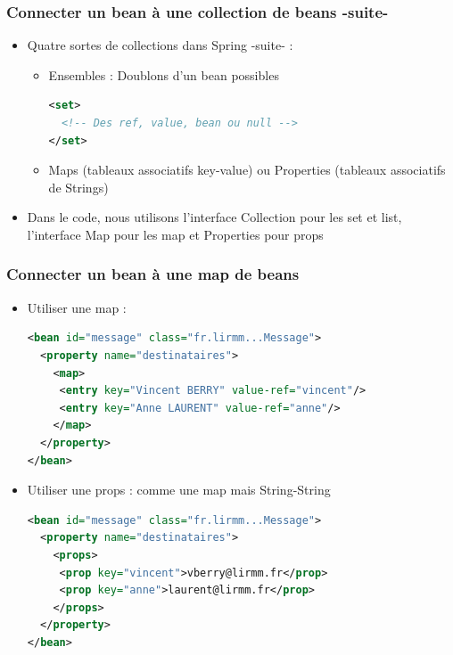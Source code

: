 \documentclass{beamer}
\begin{document}
\begin{frame}[fragile]
  \frametitle{Connecter un bean à une collection de beans -suite-}
  \begin{itemize}
    \item Quatre sortes de collections dans Spring -suite- :
\begin{itemize}
\item Ensembles : Doublons d'un bean possibles
\begin{lstlisting}[language=XML,basicstyle=\scriptsize]      
<set>
  <!-- Des ref, value, bean ou null -->
</set>
\end{lstlisting}
\item Maps (tableaux associatifs key-value) ou Properties (tableaux associatifs de Strings)
  \end{itemize}
\item Dans le code, nous utilisons l'interface Collection pour les set
et list, l'interface Map pour les map et Properties pour props
  \end{itemize}
\end{frame}

\begin{frame}[fragile]
  \frametitle{Connecter un bean à une map de beans}
  \begin{itemize}
  \item Utiliser une map :
\begin{lstlisting}[language=XML,basicstyle=\scriptsize]
<bean id="message" class="fr.lirmm...Message">
  <property name="destinataires">
    <map>
     <entry key="Vincent BERRY" value-ref="vincent"/>
     <entry key="Anne LAURENT" value-ref="anne"/>
    </map>
  </property>
</bean>
\end{lstlisting}  
\item Utiliser une props : comme une map mais String-String
\begin{lstlisting}[language=XML,basicstyle=\scriptsize]
<bean id="message" class="fr.lirmm...Message">
  <property name="destinataires">
    <props>
     <prop key="vincent">vberry@lirmm.fr</prop>
     <prop key="anne">laurent@lirmm.fr</prop>
    </props>
  </property>
</bean>
\end{lstlisting}
\end{itemize}
\end{frame}
\end{document}
